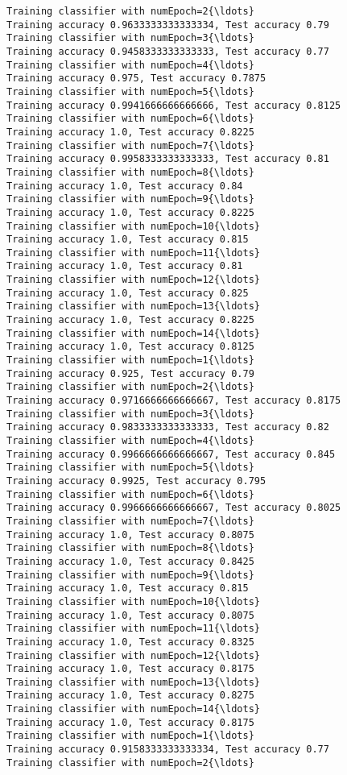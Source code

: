 \documentclass[11pt]{article}
\begin{document}
\begin{Verbatim}[commandchars=\\\{\}]
Training classifier with numEpoch=2{\ldots}
Training accuracy 0.9633333333333334, Test accuracy 0.79
Training classifier with numEpoch=3{\ldots}
Training accuracy 0.9458333333333333, Test accuracy 0.77
Training classifier with numEpoch=4{\ldots}
Training accuracy 0.975, Test accuracy 0.7875
Training classifier with numEpoch=5{\ldots}
Training accuracy 0.9941666666666666, Test accuracy 0.8125
Training classifier with numEpoch=6{\ldots}
Training accuracy 1.0, Test accuracy 0.8225
Training classifier with numEpoch=7{\ldots}
Training accuracy 0.9958333333333333, Test accuracy 0.81
Training classifier with numEpoch=8{\ldots}
Training accuracy 1.0, Test accuracy 0.84
Training classifier with numEpoch=9{\ldots}
Training accuracy 1.0, Test accuracy 0.8225
Training classifier with numEpoch=10{\ldots}
Training accuracy 1.0, Test accuracy 0.815
Training classifier with numEpoch=11{\ldots}
Training accuracy 1.0, Test accuracy 0.81
Training classifier with numEpoch=12{\ldots}
Training accuracy 1.0, Test accuracy 0.825
Training classifier with numEpoch=13{\ldots}
Training accuracy 1.0, Test accuracy 0.8225
Training classifier with numEpoch=14{\ldots}
Training accuracy 1.0, Test accuracy 0.8125
Training classifier with numEpoch=1{\ldots}
Training accuracy 0.925, Test accuracy 0.79
Training classifier with numEpoch=2{\ldots}
Training accuracy 0.9716666666666667, Test accuracy 0.8175
Training classifier with numEpoch=3{\ldots}
Training accuracy 0.9833333333333333, Test accuracy 0.82
Training classifier with numEpoch=4{\ldots}
Training accuracy 0.9966666666666667, Test accuracy 0.845
Training classifier with numEpoch=5{\ldots}
Training accuracy 0.9925, Test accuracy 0.795
Training classifier with numEpoch=6{\ldots}
Training accuracy 0.9966666666666667, Test accuracy 0.8025
Training classifier with numEpoch=7{\ldots}
Training accuracy 1.0, Test accuracy 0.8075
Training classifier with numEpoch=8{\ldots}
Training accuracy 1.0, Test accuracy 0.8425
Training classifier with numEpoch=9{\ldots}
Training accuracy 1.0, Test accuracy 0.815
Training classifier with numEpoch=10{\ldots}
Training accuracy 1.0, Test accuracy 0.8075
Training classifier with numEpoch=11{\ldots}
Training accuracy 1.0, Test accuracy 0.8325
Training classifier with numEpoch=12{\ldots}
Training accuracy 1.0, Test accuracy 0.8175
Training classifier with numEpoch=13{\ldots}
Training accuracy 1.0, Test accuracy 0.8275
Training classifier with numEpoch=14{\ldots}
Training accuracy 1.0, Test accuracy 0.8175
Training classifier with numEpoch=1{\ldots}
Training accuracy 0.9158333333333334, Test accuracy 0.77
Training classifier with numEpoch=2{\ldots}

\end{Verbatim}
\end{document}
